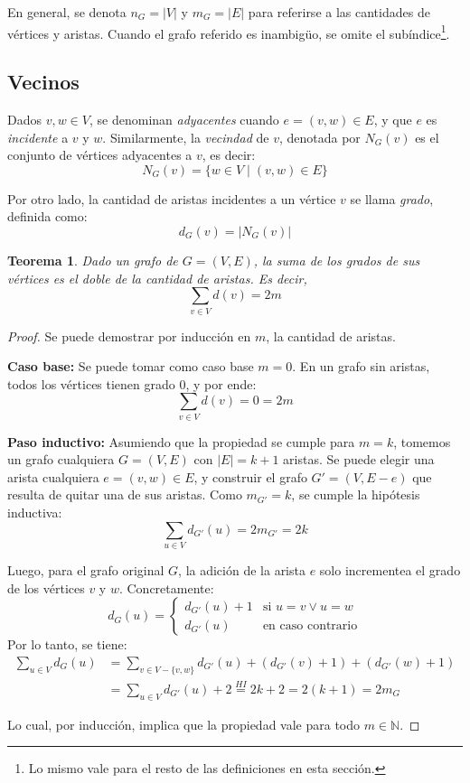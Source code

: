 \documentclass[a4paper]{report}
\newcommand{\si}{\text{si }}
\newcommand{\ecc}{\text{en caso contrario}}
\newcommand{\N}{\mathbb{N}}
\newtheorem*{theorem*}{Teorema}
\begin{document}
En general, se denota $n_G = |V|$ y $m_G = |E|$ para referirse a las cantidades de vértices y aristas. Cuando el grafo referido es inambigüo, se omite el subíndice\footnote{Lo mismo vale para el resto de las definiciones en esta sección.}.

\subsection{Vecinos}

Dados $v,w \in V$, se denominan \textit{adyacentes} cuando $e = (v,w) \in E$, y que $e$ es \textit{incidente} a $v$ y $w$. Similarmente, la \textit{vecindad} de $v$, denotada por $N_G(v)$ es el conjunto de vértices adyacentes a $v$, es decir:
$$N_G(v) = \{w \in V \mid (v, w) \in E\}$$

Por otro lado, la cantidad de aristas incidentes a un vértice $v$ se llama \textit{grado}, definida como:
$$d_G(v) = |N_G(v)|$$

\begin{theorem*}
    Dado un grafo de $G = (V, E)$, la suma de los grados de sus vértices es el doble de la cantidad de aristas. Es decir,
    $$\sum_{v \in V} d(v) = 2m$$
\end{theorem*}
\begin{proof}
    Se puede demostrar por inducción en $m$, la cantidad de aristas.

    \textbf{Caso base:} Se puede tomar como caso base $m = 0$. En un grafo sin aristas, todos los vértices tienen grado $0$, y por ende:
    $$\sum_{v \in V} d(v) = 0 = 2m$$

    \textbf{Paso inductivo:} Asumiendo que la propiedad se cumple para $m = k$, tomemos un grafo cualquiera $G = (V, E)$ con $|E| = k + 1$ aristas. Se puede elegir una arista cualquiera $e = (v, w) \in E$, y construir el grafo $G' = (V, E - {e})$ que resulta de quitar una de sus aristas. Como $m_{G'} = k$, se cumple la hipótesis inductiva:
    $$\sum_{u \in V} d_{G'}(u) = 2m_{G'} = 2k$$

    Luego, para el grafo original $G$, la adición de la arista $e$ solo incrementea el grado de los vértices $v$ y $w$. Concretamente:
    $$
        d_G(u) =
        \begin{cases}
            d_{G'}(u) + 1 & \si u = v \lor u = w \\
            d_{G'}(u)     & \ecc
        \end{cases}
    $$
    Por lo tanto, se tiene:
    \begin{align*}
        \sum_{u \in V} d_G(u) & = \sum_{v \in V - \{v, w\}} d_{G'}(u) + (d_{G'}(v) + 1) + (d_{G'}(w) + 1) \\
                              & = \sum_{u \in V} d_{G'}(u) + 2 \stackrel{HI}{=} 2k + 2 = 2(k + 1) = 2m_G
    \end{align*}

    Lo cual, por inducción, implica que la propiedad vale para todo $m \in \N$.

\end{proof}
\end{document}
